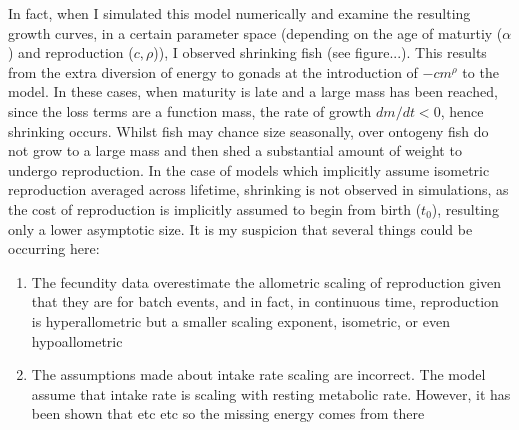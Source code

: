 \documentclass[a4paper]{article} %
\begin{document}
        In fact, when I simulated this model numerically and examine the resulting growth curves, in a certain parameter space (depending on the age of maturtiy ($\alpha$) and reproduction ($c, \rho$)), I observed shrinking fish (see figure...). This results from the extra diversion of energy to gonads at the introduction of $- cm^\rho$ to the model. In these cases, when maturity is late and a large mass has been reached, since the loss terms are a function mass, the rate of growth $dm/dt < 0$, hence shrinking occurs. Whilst fish may chance size seasonally, over ontogeny fish do not grow to a large mass and then shed a substantial amount of weight to undergo reproduction. In the case of models which implicitly assume isometric reproduction averaged across lifetime, shrinking is not observed in simulations, as the cost of reproduction is implicitly assumed to begin from birth ($t_0$), resulting only a lower asymptotic size. It is my suspicion that several things could be occurring here:
            \begin{enumerate}
                \item The fecundity data \autocite{Barneche2018d} overestimate the allometric scaling of reproduction given that they are for batch events, and in fact, in continuous time, reproduction is hyperallometric but a smaller scaling exponent, isometric, or even hypoallometric
                \item The assumptions made about intake rate scaling are incorrect. The \cite{West2001} model assume that intake rate is scaling with resting metabolic rate. However, it has been shown that \autocite{Pawar2012} etc etc so the missing energy comes from there
            \end{enumerate}
        
\end{document}
